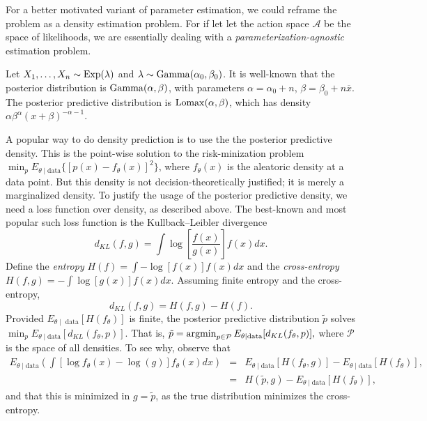 For a better motivated variant of parameter estimation, we could reframe
the problem as a density estimation problem. For if let let the action
space $\mathcal{A}$ be the space of likelihoods, we are essentially
dealing with a \emph{parameterization-agnostic} estimation problem. 
\begin{example}
\label{exa:exponential estimation} Let $X_{1},\ldots,X_{n}\sim\operatorname{Exp}(\lambda)$
and $\lambda\sim\operatorname{Gamma}(\alpha_{0},\beta_{0})$. It is well-known
that the posterior distribution is $\operatorname{Gamma}(\alpha,\beta)$, with
parameters $\alpha=\alpha_{0}+n$, $\beta=\beta_{0}+n\overline{x}$.
The posterior predictive distribution is $\operatorname{Lomax}(\alpha,\beta)$,
which has density $\alpha\beta^{\alpha}(x+\beta)^{-\alpha-1}$. 

A popular way to do density prediction is to use the the posterior
predictive density. This\emph{ }is the point-wise solution to the
risk-minization problem $\min_{p}E_{\theta\mid\textrm{data}}\{[p(x)-f_{\theta}(x)]^{2}\}$,
where $f_{\theta}(x)$ is the aleatoric density at a data point. But
this density is not decision-theoretically justified; it is merely
a marginalized density. To justify the usage of the posterior predictive
density, we need a loss function over density, as described above.
The best-known and most popular such loss function is the Kullback--Leibler\emph{
}divergence \parencite{Kullback1951-kv}
\begin{equation}
d_{KL}(f,g)=\int\log\left[\frac{f(x)}{g(x)}\right]f(x)dx.\label{eq:Kullback-Leibler}
\end{equation}
 Define the \emph{entropy} $H(f)=\int-\log[f(x)]f(x)dx$ and the \emph{cross-entropy}
$H(f,g)=-\int\log[g(x)]f(x)dx$. Assuming finite entropy and the cross-entropy,
\begin{equation}
d_{KL}(f,g)=H(f,g)-H(f).\label{eq:Kullback--Leibler(entropy)}
\end{equation}
Provided $E_{\theta\mid\textrm{ data}}[H(f_{\theta})]$ is finite,
the posterior predictive distribution $\tilde{p}$ solves $\min_{p}E_{\theta\mid\textrm{data}}[d_{KL}(f_{\theta},p)]$.
That is, $\tilde{p}=\operatorname{argmin}_{p\in\mathcal{P}}E_{\theta\mid\textrm{data}}[d_{KL}(f_{\theta},p)],$
where $\mathcal{P}$ is the space of all densities. To see why, observe
that
\begin{eqnarray}
E_{\theta\mid\textrm{data}}(\int[\log f_{\theta}(x)-\log(g)]f_{\theta}(x)dx) & = & E_{\theta\mid\textrm{data}}[H(f_{\theta},g)]-E_{\theta\mid\textrm{data}}[H(f_{\theta})],\label{eq:cross-entropy equality}\\
 & = & H(\tilde{p},g)-E_{\theta\mid\textrm{data}}[H(f_{\theta})],\nonumber 
\end{eqnarray}
and that this is minimized in $g=\tilde{p}$, as the true distribution
minimizes the cross-entropy. 


\end{example}
